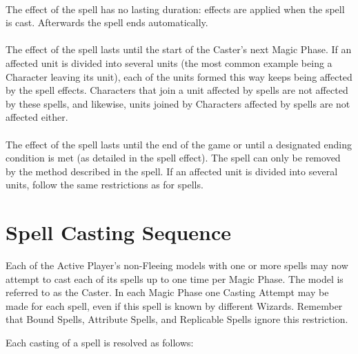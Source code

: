 \paragraph{\instant}

The effect of the spell has no lasting duration: effects are applied when the spell is cast. Afterwards the spell ends automatically.

\paragraph{\oneturn}
\idx[main=y]{\oneturn{}}\label{one_turn}

The effect of the spell lasts until the start of the Caster's next Magic Phase. If an affected unit is divided into several units (the most common example being a Character leaving its unit), each of the units formed this way keeps being affected by the spell effects. Characters that join a unit affected by \oneturn{} spells are not affected by these spells, and likewise, units joined by Characters affected by \oneturn{} spells are not affected either.

\paragraph{\permanent}

The effect of the spell lasts until the end of the game or until a designated ending condition is met (as detailed in the spell effect). The spell can only be removed by the method described in the spell. If an affected unit is divided into several units, follow the same restrictions as for \oneturn{} spells.

\section{Spell Casting Sequence}
\label{spell_casting_sequence}

Each of the Active Player's non-Fleeing models with one or more spells may now attempt to cast each of its spells up to one time per Magic Phase. The model is referred to as the Caster. In each Magic Phase one Casting Attempt may be made for each spell, even if this spell is known by different Wizards. Remember that Bound Spells, Attribute Spells, and Replicable Spells ignore this restriction.

Each casting of a spell is resolved as follows:

